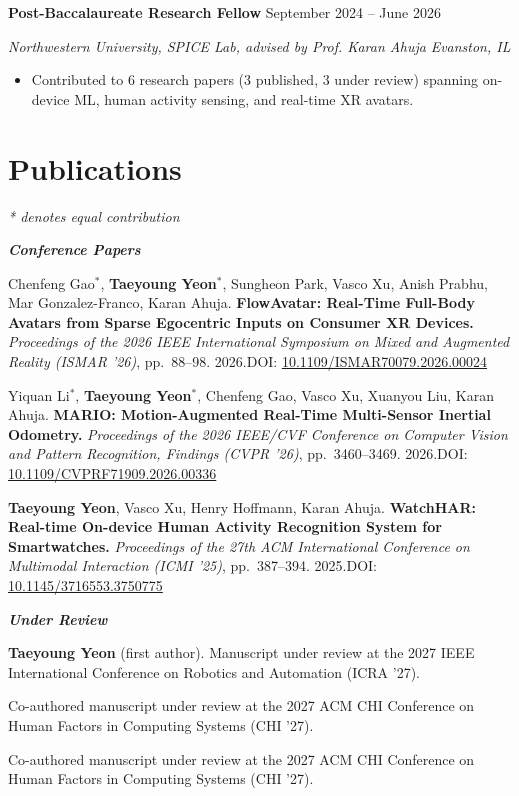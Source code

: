 \documentclass[11pt,letterpaper]{article}
\newcommand{\entry}[4]{%
\textbf{#1} \hfill #2\par
\textit{#3} \hfill \textit{#4}\par
}
\newcommand{\entrygap}{\vspace{8pt}}
\newcommand{\pubgroup}[1]{\vspace{8pt}\textbf{\textit{#1}}\par\vspace{3pt}}
\newcommand{\me}{\textbf{Taeyoung Yeon}}
\begin{document}
\entrygap

\entry{Post-Baccalaureate Research Fellow}{September 2024 -- June 2026}{Northwestern University, SPICE Lab, advised by Prof. Karan Ahuja}{Evanston, IL}
\begin{itemize}[leftmargin=1.5em,nosep,topsep=3pt]
\item Contributed to 6 research papers (3 published, 3 under review) spanning on-device ML, human activity sensing, and real-time XR avatars.
\end{itemize}

\section{Publications}
{\small\textit{* denotes equal contribution}}

\pubgroup{Conference Papers}
\begin{enumerate}[label={[C\arabic*]}]
\item Chenfeng Gao$^*$, \me$^*$, Sungheon Park, Vasco Xu, Anish Prabhu, Mar Gonzalez-Franco, Karan Ahuja. \textbf{FlowAvatar: Real-Time Full-Body Avatars from Sparse Egocentric Inputs on Consumer XR Devices.} \textit{Proceedings of the 2026 IEEE International Symposium on Mixed and Augmented Reality (ISMAR '26)}, pp.~88--98. 2026.\newline DOI: \href{https://doi.org/10.1109/ISMAR70079.2026.00024}{10.1109/ISMAR70079.2026.00024}
\item Yiquan Li$^*$, \me$^*$, Chenfeng Gao, Vasco Xu, Xuanyou Liu, Karan Ahuja. \textbf{MARIO: Motion-Augmented Real-Time Multi-Sensor Inertial Odometry.} \textit{Proceedings of the 2026 IEEE/CVF Conference on Computer Vision and Pattern Recognition, Findings (CVPR '26)}, pp.~3460--3469. 2026.\newline DOI: \href{https://doi.org/10.1109/CVPRF71909.2026.00336}{10.1109/CVPRF71909.2026.00336}
\item \me, Vasco Xu, Henry Hoffmann, Karan Ahuja. \textbf{WatchHAR: Real-time On-device Human Activity Recognition System for Smartwatches.} \textit{Proceedings of the 27th ACM International Conference on Multimodal Interaction (ICMI '25)}, pp.~387--394. 2025.\newline DOI: \href{https://doi.org/10.1145/3716553.3750775}{10.1145/3716553.3750775}
\end{enumerate}

\pubgroup{Under Review}
\begin{enumerate}[label={[U\arabic*]}]
\item \me{} (first author). Manuscript under review at the 2027 IEEE International Conference on Robotics and Automation (ICRA '27).
\item Co-authored manuscript under review at the 2027 ACM CHI Conference on Human Factors in Computing Systems (CHI '27).
\item Co-authored manuscript under review at the 2027 ACM CHI Conference on Human Factors in Computing Systems (CHI '27).
\end{enumerate}
\end{document}
